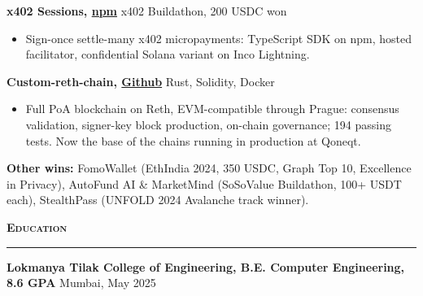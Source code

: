 \documentclass[letterpaper,10pt]{article}
\newcommand{\sectionrule}[1]{%
  \vspace{3pt}%
  {\large\scshape\bfseries #1}\par\vspace{1pt}\hrule\vspace{3pt}%
}
\newcommand{\entry}[2]{%
  \textbf{#1} \hfill {\small #2}\par%
}
\newenvironment{bullets}{%
  \begin{itemize}\setlength{\itemsep}{0pt}\setlength{\parskip}{0pt}
\setlength{\leftmargini}{1.15em}\setlength{\topsep}{1pt}%
}{\end{itemize}\vspace{1pt}}
\begin{document}
\entry{x402 Sessions, \href{https://www.npmjs.com/package/elsa-x402-sessions}{npm}}{x402 Buildathon, 200 USDC won}
\begin{bullets}
  \item Sign-once settle-many x402 micropayments: TypeScript SDK on npm, hosted facilitator, confidential Solana variant on Inco Lightning.
\end{bullets}

\entry{Custom-reth-chain, \href{https://github.com/0xshubhs/custom-reth-chain}{Github}}{Rust, Solidity, Docker}
\begin{bullets}
  \item Full PoA blockchain on Reth, EVM-compatible through Prague: consensus validation, signer-key block production,
        on-chain governance; 194 passing tests. Now the base of the chains running in production at Qoneqt.
\end{bullets}

\textbf{Other wins:} {\small FomoWallet (EthIndia 2024, 350 USDC, Graph Top 10, Excellence in Privacy), AutoFund AI \&
MarketMind (SoSoValue Buildathon, 100+ USDT each), StealthPass (UNFOLD 2024 Avalanche track winner).}

\sectionrule{Education}
\entry{Lokmanya Tilak College of Engineering, B.E. Computer Engineering, 8.6 GPA}{Mumbai, May 2025}
\end{document}
